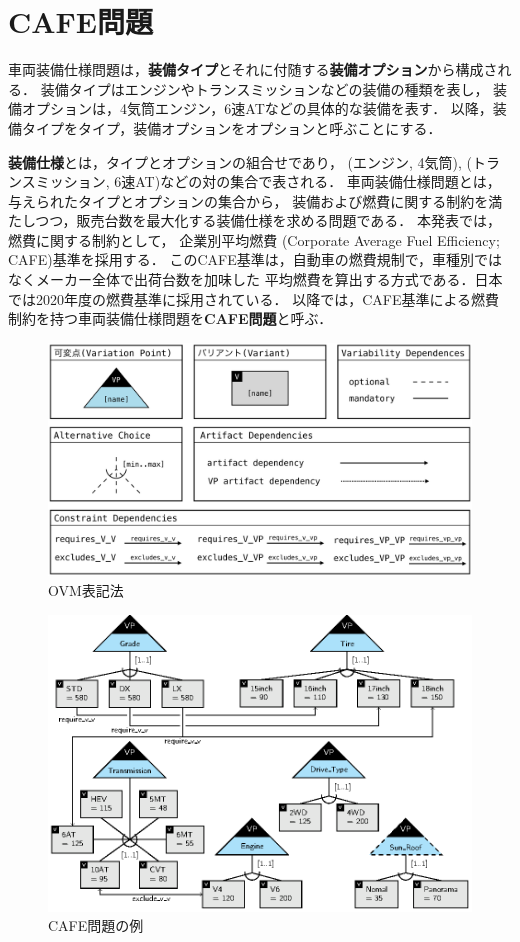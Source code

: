\section{CAFE問題}\label{sec:background}

車両装備仕様問題は，\textbf{装備タイプ}とそれに付随する\textbf{装備オプション}から構成される．
装備タイプはエンジンやトランスミッションなどの装備の種類を表し，
装備オプションは，4気筒エンジン，6速ATなどの具体的な装備を表す．
以降，装備タイプをタイプ，装備オプションをオプションと呼ぶことにする．


\textbf{装備仕様}とは，タイプとオプションの組合せであり，
(エンジン, 4気筒), (トランスミッション, 6速AT)などの対の集合で表される．
車両装備仕様問題とは，与えられたタイプとオプションの集合から，
装備および燃費に関する制約を満たしつつ，販売台数を最大化する装備仕様を求める問題である．
本発表では，燃費に関する制約として，
企業別平均燃費 (Corporate Average Fuel Efficiency; CAFE)基準を採用する．
このCAFE基準は，自動車の燃費規制で，車種別ではなくメーカー全体で出荷台数を加味した
平均燃費を算出する方式である．日本では2020年度の燃費基準に採用されている．
以降では，CAFE基準による燃費制約を持つ車両装備仕様問題を\textbf{CAFE問題}と呼ぶ．

\begin{figure}[tb]
 \centerline {\includegraphics[width=\linewidth]{images/notation.eps}}
 \caption{OVM表記法\cite{Pohl05:sple}}
 \label{fig:ovm_notation}
\end{figure}

\begin{figure}[tb]
 \centerline {\includegraphics[width=\linewidth]{images/ovm01.eps}}
 \caption{CAFE問題の例}
 \label{fig:ovm_example}
\end{figure}

